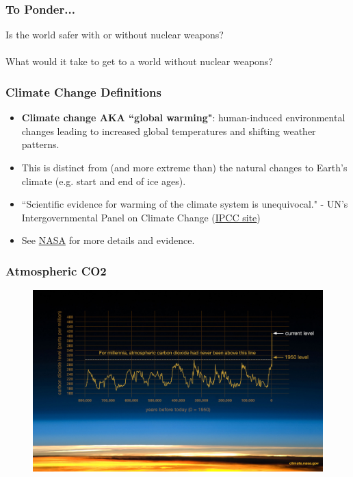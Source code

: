 \documentclass[handout]{beamer}
\begin{document}
\begin{frame} 
\frametitle{\LARGE{To Ponder...}}
\centering
	\Large{Is the world safer with or without nuclear weapons? \\~\\ What would it take to get to a world without nuclear weapons?}
	
\end{frame}

\begin{frame} 
	\frametitle{\LARGE{Climate Change Definitions}}
	\begin{itemize}
		\item \textbf{Climate change AKA ``global warming"}: human-induced environmental changes leading to increased global temperatures and shifting weather patterns. \pause
		\item This is distinct from (and more extreme than) the natural changes to Earth's climate (e.g. start and end of ice ages).
		\item ``Scientific evidence for warming of the climate system is unequivocal." - UN's Intergovernmental Panel on Climate Change (\href{https://www.ipcc.ch/}{IPCC site})
		\item See \href{https://climate.nasa.gov/evidence/}{NASA} for more details and evidence.
	\end{itemize}
\end{frame}

\begin{frame} 
	\frametitle{\LARGE{Atmospheric CO2}}
	\begin{figure}[ht!]
		\centering
		\includegraphics[width=\textwidth,height=0.9\textheight, keepaspectratio]{NASAco2.jpg}
	\end{figure}
\end{frame}
\end{document}
